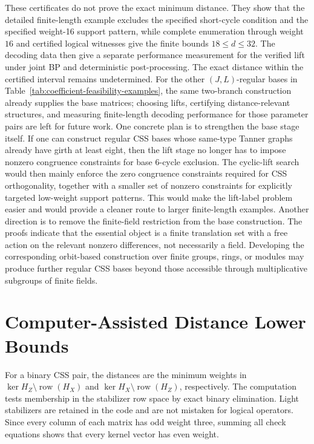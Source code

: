 \documentclass[11pt,a4paper]{article}
\theoremstyle{uprighttheorem}
\begin{document}
These certificates do not prove the exact minimum distance.
They show that the detailed finite-length example excludes the specified short-cycle condition and the specified weight-16 support pattern, while complete enumeration through weight $16$ and certified logical witnesses give the finite bounds \(18\le d\le32\).
The decoding data then give a separate performance measurement for the verified lift under joint BP and deterministic post-processing.
The exact distance within the certified interval remains undetermined.
For the other \((J,L)\)-regular bases in Table~\ref{tab:coefficient-feasibility-examples}, the same two-branch construction already supplies the base matrices; choosing lifts, certifying distance-relevant structures, and measuring finite-length decoding performance for those parameter pairs are left for future work.
One concrete plan is to strengthen the base stage itself.
If one can construct regular CSS bases whose same-type Tanner graphs already have girth at least eight, then the lift stage no longer has to impose nonzero congruence constraints for base 6-cycle exclusion.
The cyclic-lift search would then mainly enforce the zero congruence constraints required for CSS orthogonality, together with a smaller set of nonzero constraints for explicitly targeted low-weight support patterns.
This would make the lift-label problem easier and would provide a cleaner route to larger finite-length examples.
Another direction is to remove the finite-field restriction from the base construction.
The proofs indicate that the essential object is a finite translation set with a free action on the relevant nonzero differences, not necessarily a field.
Developing the corresponding orbit-based construction over finite groups, rings, or modules may produce further regular CSS bases beyond those accessible through multiplicative subgroups of finite fields.

\appendix
\section{Computer-Assisted Distance Lower Bounds}\label{sec:distance-enumeration}
For a binary CSS pair, the distances are the minimum weights in
$\ker H_Z\setminus\operatorname{row}(H_X)$ and
$\ker H_X\setminus\operatorname{row}(H_Z)$, respectively.
The computation tests membership in the stabilizer row space by exact binary elimination.
Light stabilizers are retained in the code and are not mistaken for logical operators.
Since every column of each matrix has odd weight three, summing all check equations shows that every kernel vector has even weight.
\end{document}
